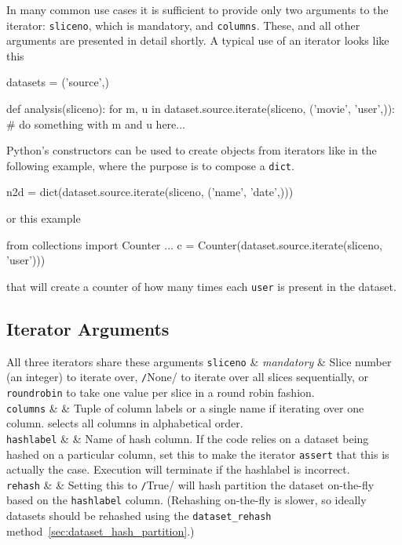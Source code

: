 In many common use cases it is sufficient to provide only two
arguments to the iterator: \texttt{sliceno}, which is mandatory,
and \texttt{columns}.  These, and all other arguments are presented in
detail shortly. A typical use of an iterator looks like this
\begin{python}
datasets = ('source',)

def analysis(sliceno):
    for m, u in dataset.source.iterate(sliceno, ('movie', 'user',)):
        # do something with m and u here...
\end{python}
Python's constructors can be used to create objects from iterators
like in the following example, where the purpose is to compose
a \texttt{dict}.
\begin{python}
n2d = dict(dataset.source.iterate(sliceno, ('name', 'date',)))
\end{python}
or this example
\begin{python}
from collections import Counter
...
    c = Counter(dataset.source.iterate(sliceno, 'user')))
\end{python}
that will create a counter of how many times each \texttt{user} is
present in the dataset.


\newpage
\subsection{Iterator Arguments}

All three iterators share these arguments
\starttable
  \RP \texttt{sliceno} & \textsl{mandatory} & Slice number (an
  integer) to iterate over, \texttt/None/ to iterate over
  all slices sequentially, or \texttt{roundrobin} to take one value
  per slice in a round robin fashion. \\[1ex]

  \RP \texttt{columns} & \pyNone & Tuple of column labels or a single
  name if iterating over one column.  \pyNone selects all columns in
  alphabetical order.\\[1ex]

  \RP \texttt{hashlabel} & \pyNone & Name of hash column.  If the code
  relies on a dataset being hashed on a particular column, set this to
  make the iterator \texttt{assert} that this is actually the case.
  Execution will terminate if the hashlabel is incorrect.\\[1ex]

  \RP \texttt{rehash} & \pyFalse & Setting this
  to \texttt/True/ will hash partition the dataset
  on-the-fly based on the \texttt{hashlabel} column.  (Rehashing
  on-the-fly is slower, so ideally datasets should be rehashed using
  the \texttt{dataset\_rehash}
  method~\ref{sec:dataset_hash_partition}.)\\[1ex]
  
